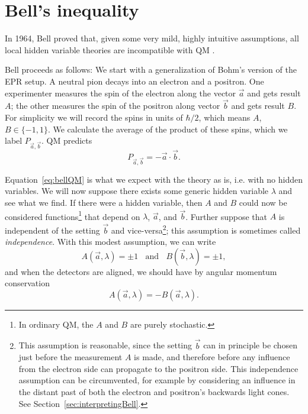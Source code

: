 \section{Bell's inequality}
In 1964, Bell proved that, given some very mild, highly intuitive assumptions,
all local hidden variable theories are incompatible with QM
\cite{bell_einstein_1964}.

Bell proceeds as follows: We start with a generalization of Bohm's version
of the EPR setup. A neutral pion decays into an electron and a positron.
One experimenter measures the spin of the electron along the vector
$\vec{a}$ and gets result $A$; the other measures the spin of the positron
along vector $\vec{b}$ and gets result $B$. For simplicity we will record
the spins in units of $\hbar/2$, which means $A$, $B\in\{-1,1\}$. We
calculate the average of the product of these spins, which we label 
$P_{\vec{a},\vec{b}}$.
QM predicts
\begin{equation}\label{eq:bellQM}
  P_{\vec{a},\vec{b}}=-\vec{a}\cdot\vec{b}.
\end{equation}

Equation~\eqref{eq:bellQM} is what we expect with the theory as is, i.e. with
no hidden variables.
We will now suppose there exists some generic hidden variable $\lambda$ and see
what we find. If there were a hidden variable, then $A$ and $B$ could now
be considered functions\footnote{In ordinary QM, the $A$ and $B$ are
purely stochastic.} that depend
on $\lambda$, $\vec{a}$, and $\vec{b}$. Further suppose
that $A$ is independent of the setting $\vec{b}$ and
vice-versa\footnote{This assumption is reasonable, since the setting 
$\vec{b}$ can
in principle be chosen just before the measurement $A$ is made, and therefore
before any influence from the electron side can propagate to the positron side.
This independence assumption can be circumvented, for example by considering
an influence in the distant past of both the electron and positron's
backwards light cones. See Section~\ref{sec:interpretingBell}.}; this
assumption is sometimes called {\it independence}. With this modest
assumption, we can write
\begin{equation}\label{eq:bellindep}
  A(\vec{a},\lambda)=\pm1~~~~\text{and}~~~~B(\vec{b},\lambda)=\pm1,
\end{equation}
and when the detectors are aligned, we should have by angular momentum 
conservation
\begin{equation}
  A(\vec{a},\lambda)=-B(\vec{a},\lambda).
\end{equation}

